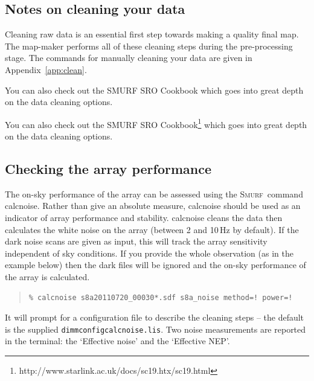 \documentclass[twoside,11pt]{article}
\newcommand{\htmlref}[2]{#1}
\newenvironment{latexonly}{}{}
\newcommand{\latexhtml}[2]{#1}
\newcommand{\xref}[3]{#1}
\newcommand{\xlabel}[1]{}
\renewcommand{\_}{\texttt{\symbol{95}}}
\newenvironment{myquote}{\begin{quote}\begin{small}}{\end{small}\end{quote}}
\newcommand{\smurf}{\xref{\textsc{Smurf}}{sun258}{}}
\newcommand{\task}[1]{\textsf{#1}}
\newcommand{\calcnoise}{\xref{\task{calcnoise}}{sun258}{CALCNOISE}}
\newcommand{\cref}[3]{\latexhtml{#1~\ref{#2}}{\htmlref{#3}{#2}}}
\begin{document}
\subsection{\xlabel{clean}Notes on cleaning your data}
\label{sec:clean}
Cleaning raw data is an essential first step towards making a quality
final map. The map-maker performs all of these cleaning steps during
the pre-processing stage. The commands for manually cleaning your data
are given in \cref{Appendix}{app:clean}{Cleaning the Raw Data}.

\begin{htmlonly}
You can also check out the \xref{SMURF SRO Cookbook}{sc19}{} which
goes into great depth on the data cleaning options.
\end{htmlonly}
\begin{latexonly}
You can also check out the SMURF SRO
Cookbook{\footnote{http://www.starlink.ac.uk/docs/sc19.htx/sc19.html}}
which goes into great depth on the data cleaning options.
\end{latexonly}


\subsection{\xlabel{calcnoise}Checking the array performance}
\label{sec:calcnoise}

The on-sky performance of the array can be assessed using the \smurf\
command \calcnoise. Rather than give an absolute measure, \task{calcnoise}
should be used as an indicator of array performance and stability.
\task{calcnoise} cleans the data then calculates the
white noise on the array (between 2 and 10\,Hz by default). If the
dark noise scans are given as input, this will track the array
sensitivity independent of sky conditions. If you provide the whole
observation (as in the example below) then the dark files will be
ignored and the on-sky performance of the array is calculated.

\begin{myquote}
\begin{verbatim}
% calcnoise s8a20110720_00030*.sdf s8a_noise method=! power=!
\end{verbatim}
\end{myquote}
It will prompt for a configuration file to describe the cleaning
steps -- the default is the supplied \texttt{dimmconfig\_calcnoise.lis}.
Two noise measurements are reported in the terminal: the
`Effective noise' and the `Effective NEP'.
\end{document}
